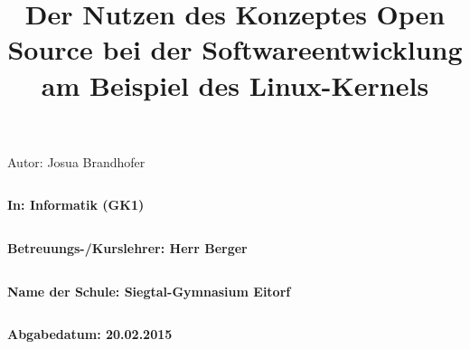 \documentclass[a4paper,12pt]{article}
\title{Der Nutzen des Konzeptes Open Source bei der Softwareentwicklung am Beispiel des Linux-Kernels}
\date{}
\begin{document}
\maketitle
\thispagestyle{empty}
\begin{center}
  \LARGE Autor:    Josua Brandhofer
\end{center}
\begin{verbatim}
\end{verbatim}
\begin{center}
  \large\textbf{In:   Informatik (GK1)}
\end{center}
\begin{verbatim}
\end{verbatim}
\begin{center}
  \large\textbf{Betreuungs-/Kurslehrer:    Herr Berger}
\end{center}
\begin{verbatim}
\end{verbatim}
\begin{center}
  \large\textbf{Name der Schule:    Siegtal-Gymnasium Eitorf}
\end{center}
\begin{verbatim}
\end{verbatim}
\begin{center}
  \large\textbf{Abgabedatum:    20.02.2015}
\end{center}

\newpage
{}
\tableofcontents
\newpage
\end{document}
